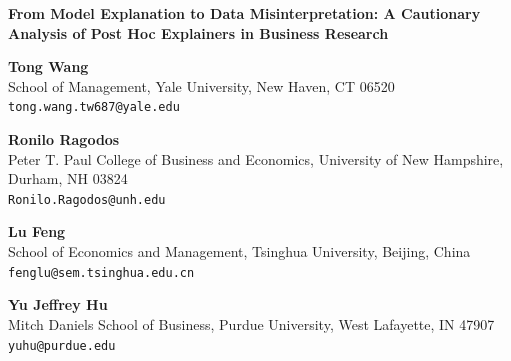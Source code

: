 \documentclass[11pt]{article}
\begin{document}
\begin{center}
    {\Large \textbf{From Model Explanation to Data Misinterpretation: A Cautionary Analysis of Post Hoc Explainers in Business Research}}

    \vspace{1em}

    \textbf{Tong Wang} \\
    School of Management, Yale University, New Haven, CT 06520 \\
    \texttt{tong.wang.tw687@yale.edu}

    \vspace{0.75em}

    \textbf{Ronilo Ragodos} \\
    Peter T. Paul College of Business and Economics, University of New Hampshire, Durham, NH 03824 \\
    \texttt{Ronilo.Ragodos@unh.edu}

    \vspace{0.75em}

    \textbf{Lu Feng} \\
    School of Economics and Management, Tsinghua University, Beijing, China \\
    \texttt{fenglu@sem.tsinghua.edu.cn}

    \vspace{0.75em}

    \textbf{Yu Jeffrey Hu} \\
    Mitch Daniels School of Business, Purdue University, West Lafayette, IN 47907 \\
    \texttt{yuhu@purdue.edu}
\end{center}

\vspace{0.5em}
\end{document}
